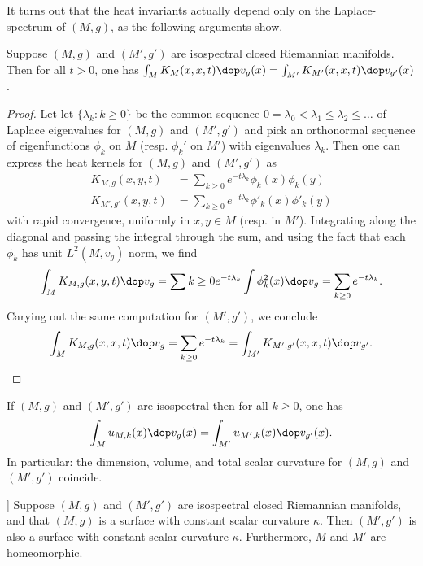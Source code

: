 It turns out that the heat invariants actually depend only on the Laplace-spectrum of $(M,g)$, as the following arguments show.
\begin{proposition}
  Suppose $(M,g)$ and $(M',g')$ are isospectral closed Riemannian manifolds.  Then for all $t>0$, one has $\int_M K_M(x,x,t) \dop v_g(x) = \int_{M'} K_{M'}(x,x,t)\dop v_{g'}(x)$.
\end{proposition}
\begin{proof}
  Let let $\{\lambda_k : k\geq 0\}$ be the common sequence $0 = \lambda_0 < \lambda_1 \leq \lambda_2 \leq \dots $ of Laplace eigenvalues for $(M,g)$ and $(M',g')$ and pick an orthonormal sequence of eigenfunctions $\phi_k$ on $M$ (resp. $\phi_k'$ on $M'$) with eigenvalues $\lambda_k$. Then one can express the heat kernels for $(M,g)$ and $(M',g')$ as
  \begin{align}
    K_{M,g}(x,y,t)   & = \sum_{k\geq 0}e^{-t \lambda_k}\phi_k(x) \phi_k(y)   \\
    K_{M',g'}(x,y,t) & = \sum_{k\geq 0}e^{-t \lambda_k}\phi'_k(x) \phi'_k(y)
  \end{align}
  with rapid convergence, uniformly in $x,y \in M$ (resp. in $M'$). Integrating along the diagonal and passing the integral through the sum, and using the fact that each $\phi_k$ has unit $L^2(M,v_g)$ norm,  we find
  \begin{align}
    \int_M K_{M,g}(x,y,t) \dop v_g  = \sum{k\geq 0}e^{-t \lambda_k} \int \phi_k^2(x)\dop v_g = \sum_{k\geq 0}e^{-t \lambda_k}.
  \end{align}
  Carying out the same computation for $(M',g')$, we conclude
  \begin{align}
    \int_M K_{M,g} (x,x,t) \dop v_g = \sum_{k\geq 0}e^{-t \lambda_k} = \int_{M'} K_{M',g'} (x,x,t) \dop v_{g'}.
  \end{align}
\end{proof}
\begin{corollary}
  If $(M,g)$ and $(M',g')$ are isospectral then for all $k\geq 0$, one has
  \begin{align}
    \int_M u_{M,k}(x) \dop v_g(x)  = \int_{M'} u_{M',k}(x) \dop v_{g'}(x).
  \end{align}
  In particular: the dimension, volume, and total scalar curvature for $(M,g)$ and $(M',g')$ coincide.
\end{corollary}
\begin{proposition}[prop. E.IV.15 in]\cite{Berger.Gauduchon.Mazet-[SpectreVarieteRiemannienne]1971a}]
  Suppose  $(M,g)$ and $(M',g')$ are isospectral closed Riemannian manifolds, and that $(M,g)$ is a surface with constant scalar curvature $\kappa$. Then $(M',g')$ is also a surface with constant scalar curvature $\kappa$. Furthermore, $M$ and $M'$ are homeomorphic.
\end{proposition}
